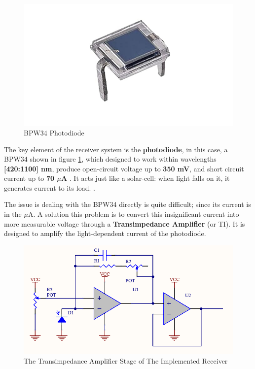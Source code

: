 \begin{figure}[h!]
	\centering
	\includegraphics[scale=0.4]{Figures/HW/BPW34.png}
	\caption{BPW34 Photodiode}
	\label{fig:hw-vlc-pd}
\end{figure}


The key element of the receiver system is the \textbf{photodiode}, in this case, a BPW34 shown in figure \ref{fig:hw-vlc-pd}, which designed to work within wavelengths \textbf{[420:1100] nm}, produce open-circuit voltage up to \textbf{350 mV}, and short circuit current up to \textbf{70 $\mu$A }. It acts just like a solar-cell: when light falls on it, it generates current to its load. \cite{BPW34-datasheet}.

\newpage

The issue is dealing with the BPW34 directly is quite difficult; since its current is in the $\mu$A. A solution this problem is to convert this insignificant current into more measurable voltage through a \textbf{Transimpedance Amplifier} (or TI). It is designed to amplify the light-dependent current of the photodiode. 

\begin{figure}[h!]
	\centering
	\includegraphics[scale=0.5]{Figures/HW/ti-amp-buffer.png}
	\caption{The Transimpedance Amplifier Stage of The Implemented Receiver}
	\label{fig:hw-ti-buffer}
\end{figure}


